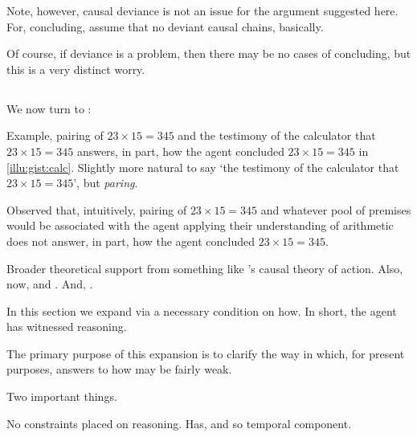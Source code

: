 \begin{note}
  Note, however, causal deviance is not an issue for the argument suggested here.
  For, concluding, assume that no deviant causal chains, basically.

  Of course, if deviance is a problem, then there may be no cases of concluding, but this is a very distinct worry.
\end{note}

\subsection{\qHow{}}
\label{sec:clar:expand:qHow}

\begin{note}[Introduction]
  We now turn to \qHow{}:
  \vspace{-\baselineskip}
  \begin{quote}
    \questionHowBasic*
  \end{quote}
  Example, pairing of \(23 \times 15 = 345\) and the testimony of the calculator that \(23 \times 15 = 345\) answers, in part, how the agent concluded \(23 \times 15 = 345\) in \autoref{illu:gist:calc}.
  Slightly more natural to say `the testimony of the calculator that \(23 \times 15 = 345\)', but \emph{paring}.

  Observed that, intuitively, pairing of \(23 \times 15 = 345\) and whatever pool of premises would be associated with the agent applying their understanding of arithmetic does not answer, in part, how the agent concluded \(23 \times 15 = 345\).
\end{note}

\begin{note}
  Broader theoretical support from something like \citeauthor{Davidson:1963aa}'s causal theory of action.
  Also, now, \citeauthor{Boghossian:2014aa} and \citeauthor{Broome:2013aa}.
  And, \citeauthor{Wright:2014tt}.
\end{note}

\begin{note}
  In this section we expand via a necessary condition on how.
  In short, the agent has witnessed reasoning.

  The primary purpose of this expansion is to clarify the way in which, for present purposes, answers to how may be fairly weak.

  Two important things.

  No constraints placed on reasoning.
  Has, and so temporal component.
\end{note}

